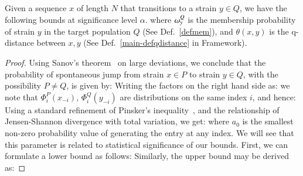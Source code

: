 \documentclass[onecolumn,10pt]{IEEEtran}
\begin{document}
\begin{thm}\label{thmbnd}
Given a sequence  $x$ of length $N$ that transitions  to a strain $y\in Q$, we have the following bounds at significance level $\alpha$.
%
  where $\omega_{y}^Q$ is the membership probability of strain $y$ in the target population $Q$ (See Def.~\ref{defmem}), and $\theta(x,y)$ is the q-distance between $x,y$ (See Def.~\ref{main-defqdistance} in \qnet Framework).
\end{thm}
\begin{proof}
Using Sanov's theorem~\cite{cover} on large deviations, we conclude that the probability of spontaneous jump from strain $x\in P$ to strain $y\in Q$, with the possibility $P \neq Q$, is given by:
Writing the factors on the right hand side as:
%
we note that $\Phi^P_i(x_{-i})$, $\Phi^Q_i(y_{-i})$ are distributions on the same index $i$, and hence:
Using a standard refinement of Pinsker's inequality~\cite{fedotov2003refinements}, and the relationship of Jensen-Shannon divergence with  total variation, we get:
%
where $a_0$ is the smallest non-zero probability value of generating the entry at any index. We will see that this parameter is related to statistical significance of our bounds. First, we can formulate a lower bound as follows:
%
Similarly,  the upper bound may be derived as:
\end{proof}
\end{document}
